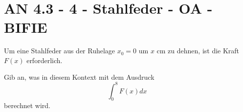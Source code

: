 \section{AN 4.3 - 4 - Stahlfeder - OA - BIFIE}

\begin{beispiel}[AN 4.3]{1} %
				Um eine Stahlfeder aus der Ruhelage $x_0=0$ um $x$ cm zu dehnen, ist die Kraft $F(x)$ erforderlich.
				
				Gib an, was in diesem Kontext mit dem Ausdruck $$\int_0^8{F(x)}dx$$ berechnet wird.
				
\end{beispiel}